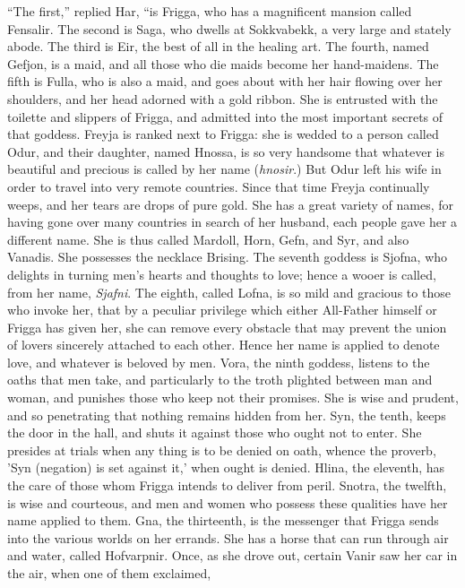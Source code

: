 ``The first,'' replied Har, ``is Frigga, who has a magnificent mansion
called Fensalir. The second is Saga, who dwells at Sokkvabekk, a very
large and stately abode. The third is Eir, the best of all in the
healing art. The fourth, named Gefjon, is a maid, and all those who
die maids become her hand-maidens. The fifth is Fulla, who is also a
maid, and goes about with her hair flowing over her shoulders, and her
head adorned with a gold ribbon. She is entrusted with the toilette
and slippers of Frigga, and admitted into the most important secrets
of that goddess. Freyja is ranked next to Frigga: she is wedded to a
person called Odur, and their daughter, named Hnossa, is so very
handsome that whatever is beautiful and precious is called by her name
(\emph{hnosir}.) But Odur left his wife in order to travel into very remote
countries. Since that time Freyja continually weeps, and her tears are
drops of pure gold. She has a great variety of names, for having gone
over many countries in search of her husband, each people gave her a
different name. She is thus called Mardoll, Horn, Gefn, and Syr, and
also Vanadis. She possesses the necklace Brising. The seventh goddess
is Sjofna, who delights in turning men's hearts and thoughts to love;
hence a wooer is called, from her name, \emph{Sjafni}. The eighth, called
Lofna, is so mild and gracious to those who invoke her, that by a
peculiar privilege which either All-Father himself or Frigga has given
her, she can remove every obstacle that may prevent the union of
lovers sincerely attached to each other. Hence her name is applied to
denote love, and whatever is beloved by men. Vora, the ninth goddess,
listens to the oaths that men take, and particularly to the troth
plighted between man and woman, and punishes those who keep not their
promises. She is wise and prudent, and so penetrating that nothing
remains hidden from her. Syn, the tenth, keeps the door in the hall,
and shuts it against those who ought not to enter. She presides at
trials when any thing is to be denied on oath, whence the proverb,
'Syn (negation) is set against it,' when ought is denied. Hlina, the
eleventh, has the care of those whom Frigga intends to deliver from
peril. Snotra, the twelfth, is wise and courteous, and men and women
who possess these qualities have her name applied to them. Gna, the
thirteenth, is the messenger that Frigga sends into the various worlds
on her errands. She has a horse that can run through air and water,
called Hofvarpnir. Once, as she drove out, certain Vanir saw her car
in the air, when one of them exclaimed,

